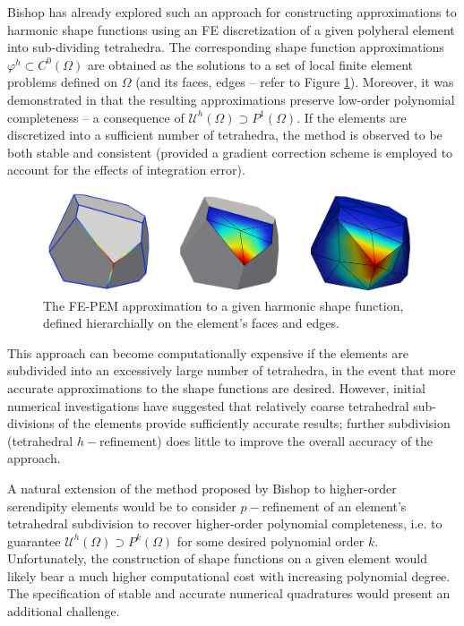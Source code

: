 	Bishop has already explored such an approach for constructing approximations to harmonic shape functions using an FE discretization of a given polyheral element into sub-dividing tetrahedra. The corresponding shape function approximations $\varphi^h \subset C^0 (\Omega)$ are obtained as the solutions to a set of local finite element problems defined on $\Omega$ (and its faces, edges -- refer to Figure \ref{fig:harmonic_fem_sfs}). Moreover, it was demonstrated in \cite{Bishop:14} that the resulting approximations preserve low-order polynomial completeness -- a consequence of $\mathcal{U}^h (\Omega) \supset P^1 (\Omega)$. If the elements are discretized into a sufficient number of tetrahedra, the method is observed to be both stable and consistent (provided a gradient correction scheme is employed to account for the effects of integration error).
	
\begin{figure} [!ht]
	\centering
	\includegraphics[width = 6.0in]{figures/harmonic_fem_sfs.pdf}
	\caption{The FE-PEM approximation to a given harmonic shape function, defined hierarchially on the element's faces and edges.}
	\label{fig:harmonic_fem_sfs}
\end{figure}
	
	This approach can become computationally expensive if the elements are subdivided into an excessively large number of tetrahedra, in the event that more accurate approximations to the shape functions are desired. However, initial numerical investigations have suggested that relatively coarse tetrahedral sub-divisions of the elements provide sufficiently accurate results; further subdivision (tetrahedral $h-$refinement) does little to improve the overall accuracy of the approach.
	
	A natural extension of the method proposed by Bishop to higher-order serendipity elements would be to consider $p-$refinement of an element's tetrahedral subdivision to recover higher-order polynomial completeness, i.e. to guarantee $\mathcal{U}^h (\Omega) \supset P^k (\Omega)$ for some desired polynomial order $k$. Unfortunately, the construction of shape functions on a given element would likely bear a much higher computational cost with increasing polynomial degree. The specification of stable and accurate numerical quadratures would present an additional challenge.
	
